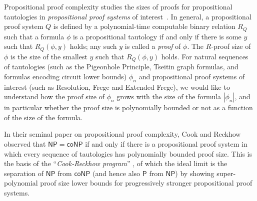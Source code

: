 \documentclass[11pt,letter]{article}
\theoremstyle{remark} %
\begin{document}

 

    Propositional proof complexity studies the sizes of proofs for propositional tautologies in {\it propositional proof systems} of interest~\cite{CR79, BP98, krajivcek2019proof}. In general, a propositional proof system $Q$ is defined by a polynomial-time computable binary relation
$R_Q$ such that a formula $\phi$ is a propositional tautology if and only if there is some $y$ such that $R_Q(\phi,y)$ holds; any such $y$ is called a {\it proof} of $\phi$. The $R$-proof size of $\phi$ is the size of the smallest $y$ such that $R_Q(\phi,y)$ holds. For natural sequences of tautologies (such as the Pigeonhole Principle, Tseitin graph formulas, and formulas encoding circuit lower bounds) $\phi_n$ and propositional proof systems of interest (such as Resolution, Frege and Extended Frege), we would like to understand how the proof size of $\phi_n$ grows with the size of the formula  $|\phi_n|$, and in particular whether the proof size is polynomially bounded or not as a function of the size of the formula.
    

     In their seminal paper on propositional proof complexity, Cook and Reckhow \cite{CR79} observed that $\mathsf{NP} = \mathsf{coNP}$ if and only if there is a propositional proof system in which every sequence of tautologies has polynomially bounded proof size. This is the basis of the ``\emph{Cook-Reckhow program}'' \cite{BP98}, of which the ideal limit is the separation of  $\mathsf{NP}$ from  $\mathsf{coNP}$ (and hence also $\mathsf{P}$ from  $\mathsf{NP}$) by showing super-polynomial proof size lower bounds for progressively stronger propositional proof systems. 
\end{document}
